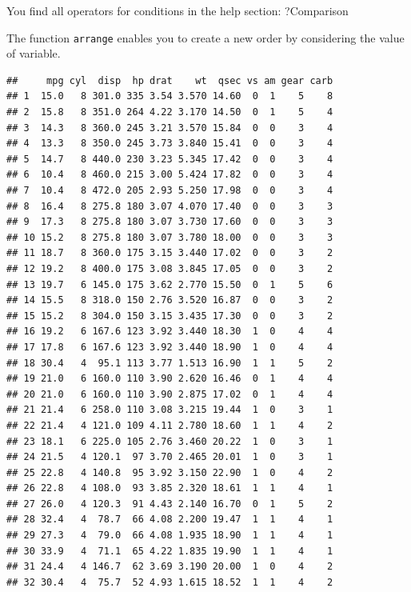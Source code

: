 \documentclass[]{report}
\newenvironment{Shaded}{\begin{snugshade}}{\end{snugshade}}
\newcommand{\KeywordTok}[1]{\textcolor[rgb]{0.13,0.29,0.53}{\textbf{#1}}}
\newcommand{\CommentTok}[1]{\textcolor[rgb]{0.56,0.35,0.01}{\textit{#1}}}
\newcommand{\NormalTok}[1]{#1}
\begin{document}
You find all operators for conditions in the help section: ?Comparison

The function \texttt{arrange} enables you to create a new order by
considering the value of variable.

\begin{Shaded}
\end{Shaded}

\begin{verbatim}
##     mpg cyl  disp  hp drat    wt  qsec vs am gear carb
## 1  15.0   8 301.0 335 3.54 3.570 14.60  0  1    5    8
## 2  15.8   8 351.0 264 4.22 3.170 14.50  0  1    5    4
## 3  14.3   8 360.0 245 3.21 3.570 15.84  0  0    3    4
## 4  13.3   8 350.0 245 3.73 3.840 15.41  0  0    3    4
## 5  14.7   8 440.0 230 3.23 5.345 17.42  0  0    3    4
## 6  10.4   8 460.0 215 3.00 5.424 17.82  0  0    3    4
## 7  10.4   8 472.0 205 2.93 5.250 17.98  0  0    3    4
## 8  16.4   8 275.8 180 3.07 4.070 17.40  0  0    3    3
## 9  17.3   8 275.8 180 3.07 3.730 17.60  0  0    3    3
## 10 15.2   8 275.8 180 3.07 3.780 18.00  0  0    3    3
## 11 18.7   8 360.0 175 3.15 3.440 17.02  0  0    3    2
## 12 19.2   8 400.0 175 3.08 3.845 17.05  0  0    3    2
## 13 19.7   6 145.0 175 3.62 2.770 15.50  0  1    5    6
## 14 15.5   8 318.0 150 2.76 3.520 16.87  0  0    3    2
## 15 15.2   8 304.0 150 3.15 3.435 17.30  0  0    3    2
## 16 19.2   6 167.6 123 3.92 3.440 18.30  1  0    4    4
## 17 17.8   6 167.6 123 3.92 3.440 18.90  1  0    4    4
## 18 30.4   4  95.1 113 3.77 1.513 16.90  1  1    5    2
## 19 21.0   6 160.0 110 3.90 2.620 16.46  0  1    4    4
## 20 21.0   6 160.0 110 3.90 2.875 17.02  0  1    4    4
## 21 21.4   6 258.0 110 3.08 3.215 19.44  1  0    3    1
## 22 21.4   4 121.0 109 4.11 2.780 18.60  1  1    4    2
## 23 18.1   6 225.0 105 2.76 3.460 20.22  1  0    3    1
## 24 21.5   4 120.1  97 3.70 2.465 20.01  1  0    3    1
## 25 22.8   4 140.8  95 3.92 3.150 22.90  1  0    4    2
## 26 22.8   4 108.0  93 3.85 2.320 18.61  1  1    4    1
## 27 26.0   4 120.3  91 4.43 2.140 16.70  0  1    5    2
## 28 32.4   4  78.7  66 4.08 2.200 19.47  1  1    4    1
## 29 27.3   4  79.0  66 4.08 1.935 18.90  1  1    4    1
## 30 33.9   4  71.1  65 4.22 1.835 19.90  1  1    4    1
## 31 24.4   4 146.7  62 3.69 3.190 20.00  1  0    4    2
## 32 30.4   4  75.7  52 4.93 1.615 18.52  1  1    4    2
\end{verbatim}
\end{document}
